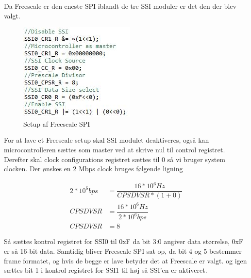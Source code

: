 Da Freescale er den eneste SPI iblandt de tre SSI moduler er det den der blev valgt.

		\begin{figure}[ht]
			\begin{center}
			\includegraphics[scale=0.8]{Billeder/Spi_Setup.jpg}
			\end{center}
			\label{fig:SPI_Setup}
			\caption{Setup af Freescale SPI}
		\end{figure}

For at lave et Freescale setup skal SSI modulet deaktiveres, også kan microcontrolleren sættes som master ved at skrive nul til control registret.
Derefter skal clock configurations registret sættes til 0 så vi bruger system clocken.
Der ønskes en 2 Mbps clock bruges følgende ligning

\begin{align*}
2*10^6 bps &= \dfrac{16*10^6 Hz}{CPSDVSR * (1 + 0)}\\
CPSDVSR &= \dfrac{16*10^6 Hz}{2*10^6 bps}\\
CPSDVSR &= 8
\end{align*}

Så sættes kontrol registret for SSI0 til 0xF da bit 3:0 angiver data størrelse, 0xF er så 16-bit data. Samtidig bliver Freescale SPI sat op, da bit 4 og 5 bestemmer frame formatet, og hvis de begge er lave betyder det at Freescale er valgt. 
og igen sættes bit 1 i kontrol registret for SSI1 til høj så SSI'en er aktiveret.
